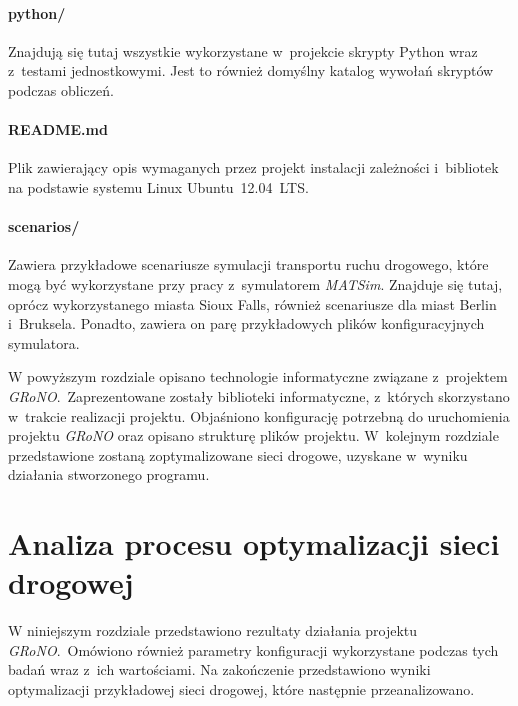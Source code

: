 \documentclass[twoside,12pt]{report}
\let\oldsection\chapter
\def\chapter{\cleardoublepage\oldsection}
\begin{document}
\subsubsection{python/}
Znajdują się tutaj wszystkie wykorzystane w~projekcie skrypty Python wraz z~testami jednostkowymi. Jest to również domyślny katalog wywołań skryptów podczas obliczeń.

\subsubsection{README.md}
Plik zawierający opis wymaganych przez projekt instalacji zależności i~bibliotek na podstawie systemu Linux Ubuntu~12.04~LTS.

\subsubsection{scenarios/}
Zawiera przykładowe scenariusze symulacji transportu ruchu drogowego, które mogą być wykorzystane przy pracy z~symulatorem \textit{MATSim}. Znajduje się tutaj, oprócz wykorzystanego miasta Sioux Falls, również scenariusze dla miast Berlin i~Bruksela. Ponadto, zawiera on parę przykładowych plików konfiguracyjnych symulatora.
\newline


W powyższym rozdziale opisano technologie informatyczne związane z~projektem \textit{GRoNO}.~Zaprezentowane zostały biblioteki informatyczne, z~których skorzystano w~trakcie realizacji projektu. Objaśniono konfigurację potrzebną do uruchomienia projektu \textit{GRoNO} oraz opisano strukturę plików projektu. W~kolejnym rozdziale przedstawione zostaną zoptymalizowane sieci drogowe, uzyskane w~wyniku działania stworzonego programu.

\chapter{Analiza procesu optymalizacji sieci drogowej}\label{rozdz.grono-praktyka} 
W niniejszym rozdziale przedstawiono rezultaty działania projektu \textit{GRoNO}.~Omówiono również parametry konfiguracji wykorzystane podczas tych badań wraz z~ich wartościami. Na zakończenie przedstawiono wyniki optymalizacji przykładowej sieci drogowej, które następnie przeanalizowano.
\end{document}
